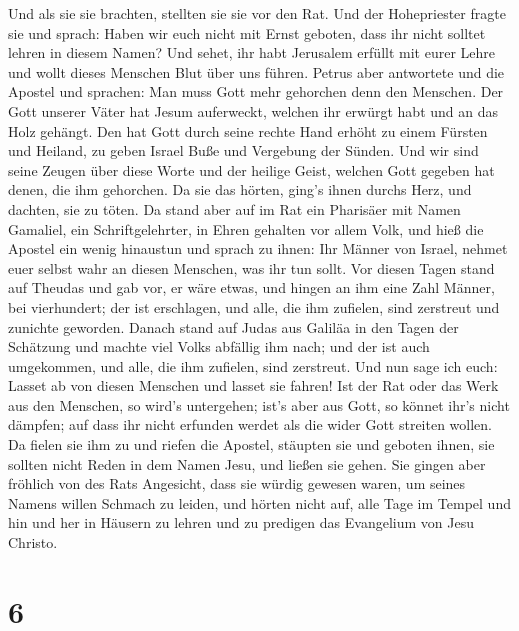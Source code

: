  Und als sie sie brachten, stellten sie sie vor den Rat.
Und der Hohepriester fragte sie  und sprach: Haben wir
euch nicht mit Ernst geboten, dass ihr nicht solltet lehren in diesem
Namen? Und sehet, ihr habt Jerusalem erfüllt mit eurer Lehre und wollt
dieses Menschen Blut über uns führen.  Petrus aber
antwortete und die Apostel und sprachen: Man muss Gott mehr gehorchen
denn den Menschen.  Der Gott unserer Väter hat Jesum
auferweckt, welchen ihr erwürgt habt und an das Holz gehängt.
 Den hat Gott durch seine rechte Hand erhöht zu einem
Fürsten und Heiland, zu geben Israel Buße und Vergebung der Sünden.
 Und wir sind seine Zeugen über diese Worte und der
heilige Geist, welchen Gott gegeben hat denen, die ihm gehorchen.
 Da sie das hörten, ging's ihnen durchs Herz, und
dachten, sie zu töten.  Da stand aber auf im Rat ein
Pharisäer mit Namen Gamaliel, ein Schriftgelehrter, in Ehren gehalten
vor allem Volk, und hieß die Apostel ein wenig hinaustun 
und sprach zu ihnen: Ihr Männer von Israel, nehmet euer selbst wahr an
diesen Menschen, was ihr tun sollt.  Vor diesen Tagen
stand auf Theudas und gab vor, er wäre etwas, und hingen an ihm eine
Zahl Männer, bei vierhundert; der ist erschlagen, und alle, die ihm
zufielen, sind zerstreut und zunichte geworden.  Danach
stand auf Judas aus Galiläa in den Tagen der Schätzung und machte viel
Volks abfällig ihm nach; und der ist auch umgekommen, und alle, die ihm
zufielen, sind zerstreut.  Und nun sage ich euch: Lasset
ab von diesen Menschen und lasset sie fahren! Ist der Rat oder das Werk
aus den Menschen, so wird's untergehen;  ist's aber aus
Gott, so könnet ihr's nicht dämpfen; auf dass ihr nicht erfunden werdet
als die wider Gott streiten wollen.  Da fielen sie ihm zu
und riefen die Apostel, stäupten sie und geboten ihnen, sie sollten
nicht Reden in dem Namen Jesu, und ließen sie gehen.  Sie
gingen aber fröhlich von des Rats Angesicht, dass sie würdig gewesen
waren, um seines Namens willen Schmach zu leiden,  und
hörten nicht auf, alle Tage im Tempel und hin und her in Häusern zu
lehren und zu predigen das Evangelium von Jesu Christo.

\hypertarget{section-5}{%
\section{6}\label{section-5}}

